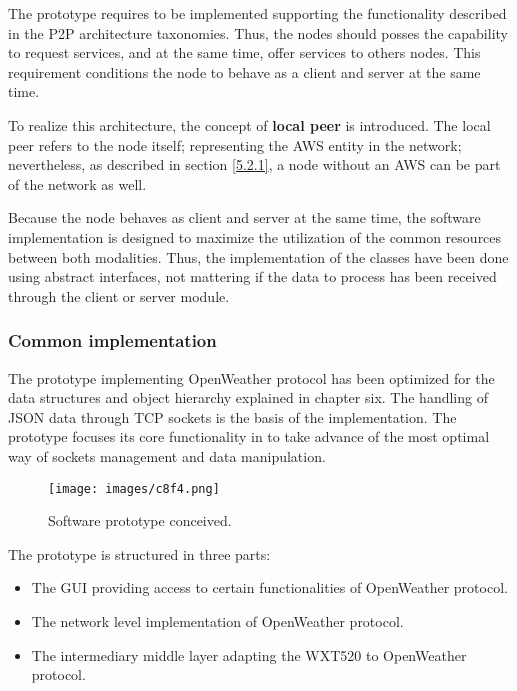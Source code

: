 The prototype requires to be implemented supporting the functionality described in the \gls{P2P} architecture taxonomies\cite{rfc5694}. Thus, the  nodes should posses the capability to request services, and at the same time, offer services to others nodes. This requirement conditions the node to behave as a client and server at the same time.

To realize this architecture, the concept of \textbf{local peer} is introduced. The local peer refers to the node itself; representing the \gls{AWS} entity in the network; nevertheless, as described in section \ref{5.2.1}, a node without an \gls{AWS} can be part of the network as well.

Because the node behaves as  client and server at the same time, the software implementation is designed to maximize the utilization of the common resources between both modalities. Thus, the implementation of the classes have been done using abstract interfaces, not mattering if the data to process has been received through the client or server module.

\subsubsection{Common implementation}

The prototype implementing OpenWeather protocol has been optimized for the data structures and object hierarchy explained in chapter six. The handling of \gls{JSON} data through \gls{TCP} sockets is the basis of the implementation.
The prototype focuses its core functionality in to take advance of the most optimal way of sockets management and data manipulation.

\begin{figure}[H]
\centerline{\texttt{[image: images/c8f4.png]}}
\caption{Software prototype conceived.}
\end{figure}

The prototype is structured in three parts:

\begin{itemize}
\item The GUI providing access to certain functionalities of OpenWeather protocol.
\item The network level implementation of OpenWeather protocol.
\item The intermediary middle layer adapting the WXT520 to OpenWeather protocol.
\end{itemize}

